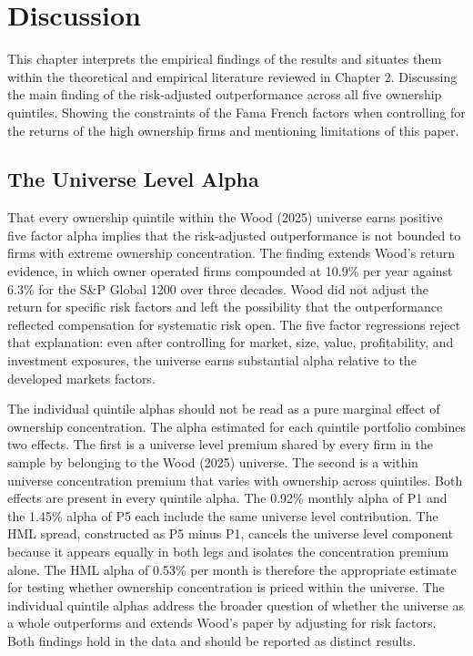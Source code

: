 
\section{Discussion}

This chapter interprets the empirical findings of the results and situates them within the theoretical and empirical literature reviewed in Chapter 2. Discussing the main finding of the risk-adjusted outperformance across all five ownership quintiles. Showing the constraints of the Fama French factors when controlling for the returns of the high ownership firms and mentioning limitations of this paper. 


\subsection{The Universe Level Alpha}

That every ownership quintile within the Wood (2025) universe earns positive five factor alpha implies that the risk-adjusted outperformance is not bounded to firms with extreme ownership concentration. The finding extends Wood's return evidence, in which owner operated firms compounded at 10.9\% per year against 6.3\% for the S\&P Global 1200 over three decades. Wood did not adjust the return for specific risk factors and left the possibility that the outperformance reflected compensation for systematic risk open. The five factor regressions reject that explanation: even after controlling for market, size, value, profitability, and investment exposures, the universe earns substantial alpha relative to the developed markets factors.

The individual quintile alphas should not be read as a pure marginal effect of ownership concentration. The alpha estimated for each quintile portfolio combines two effects. The first is a universe level premium shared by every firm in the sample by belonging to the Wood (2025) universe. The second is a within universe concentration premium that varies with ownership across quintiles. Both effects are present in every quintile alpha. The 0.92\% monthly alpha of P1 and the 1.45\% alpha of P5 each include the same universe level contribution. The HML spread, constructed as P5 minus P1, cancels the universe level component because it appears equally in both legs and isolates the concentration premium alone. The HML alpha of 0.53\% per month is therefore the appropriate estimate for testing whether ownership concentration is priced within the universe. The individual quintile alphas address the broader question of whether the universe as a whole outperforms and extends Wood's paper by adjusting for risk factors. Both findings hold in the data and should be reported as distinct results.


